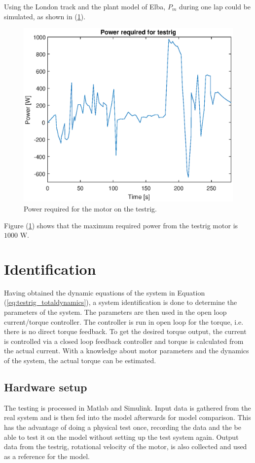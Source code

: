 Using the London track and the plant model of Elba, $P_m$ during one lap could be simulated, as shown in (\ref{fig:testrig_power_required}).

\begin{figure}[H]
    \label{fig:testrig_power_required}
    \centering
    \includegraphics[width=\textwidth]{./img/testrig_power_required.eps}
    \caption{Power required for the motor on the testrig.}
\end{figure}

Figure (\ref{fig:testrig_power_required}) shows that the maximum required power from the testrig motor is $1000$ W.

\section{Identification}
Having obtained the dynamic equations of the system in Equation
(\ref{eq:testrig_totaldynamics}), a system identification is done to determine
the parameters of the system. The parameters are then used in the open loop
current/torque controller. The controller is run in open loop for the
torque, i.e. there is no direct torque feedback. To get the desired torque
output, the current is controlled via a closed loop feedback controller and
torque is calculated from the actual current. With a knowledge about motor
parameters and the dynamics of the system, the actual torque can be estimated. 

\subsection{Hardware setup}
The testing is processed in Matlab and Simulink. Input data is gathered from the
real system and is then fed into the model afterwards for model comparison. This
has the advantage of doing a physical test once, recording the data and the be
able to test it on the model without setting up the test system again. Output
data from the testrig, rotational velocity of the motor, is also collected and
used as a reference for the model.

